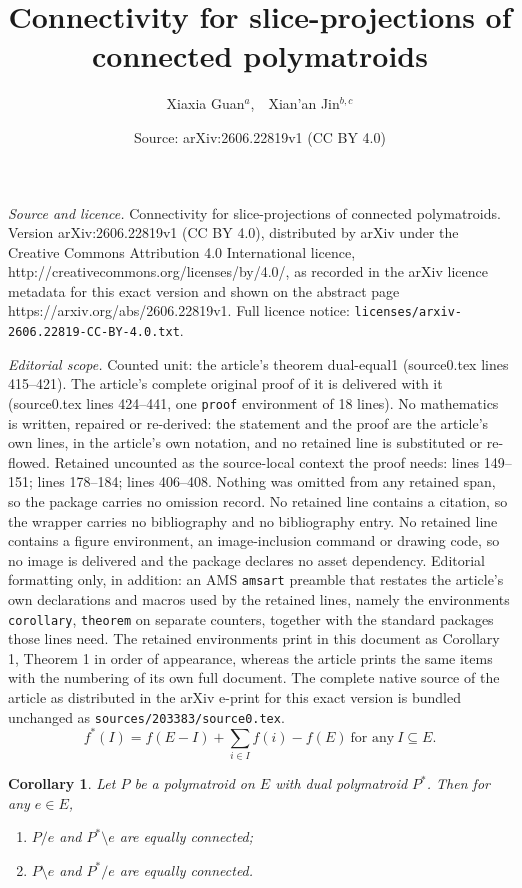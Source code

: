 \documentclass[10pt,a4paper]{amsart}
\title{Connectivity for slice-projections of connected polymatroids}
\author{Xiaxia Guan$^{a}$,~~Xian'an Jin$^{b,c}$}
\date{Source: arXiv:2606.22819v1 (CC BY 4.0)}
\newtheorem{corollary}{Corollary}
\begin{document}
\maketitle

\noindent\emph{Source and licence.} Connectivity for slice-projections of connected polymatroids. Version arXiv:2606.22819v1 (CC BY 4.0), distributed by arXiv under the Creative Commons Attribution 4.0 International licence, http://creativecommons.org/licenses/by/4.0/, as recorded in the arXiv licence metadata for this exact version and shown on the abstract page https://arxiv.org/abs/2606.22819v1. Full licence notice: \texttt{licenses/arxiv-2606.22819-CC-BY-4.0.txt}.\par\smallskip

\noindent\textit{Editorial scope.} Counted unit: the article's theorem dual-equal1 (source0.tex lines 415--421). The article's complete original proof of it is delivered with it (source0.tex lines 424--441, one \texttt{proof} environment of 18 lines). No mathematics is written, repaired or re-derived: the statement and the proof are the article's own lines, in the article's own notation, and no retained line is substituted or re-flowed.  Retained uncounted as the source-local context the proof needs: lines 149--151; lines 178--184; lines 406--408.  Nothing was omitted from any retained span, so the package carries no omission record.  No retained line contains a citation, so the wrapper carries no bibliography and no bibliography entry.  No retained line contains a figure environment, an image-inclusion command or drawing code, so no image is delivered and the package declares no asset dependency.  Editorial formatting only, in addition: an AMS \texttt{amsart} preamble that restates the article's own declarations and macros used by the retained lines, namely the environments \texttt{corollary}, \texttt{theorem} on separate counters, together with the standard packages those lines need.  The retained environments print in this document as Corollary 1, Theorem 1 in order of appearance, whereas the article prints the same items with the numbering of its own full document.  The complete native source of the article as distributed in the arXiv e-print for this exact version is bundled unchanged as \texttt{sources/203383/source0.tex}.
\begin{equation}\label{dual-rank}
f^*(I) = f(E-I) + \sum_{i \in I} f(i) - f(E) ~\text{for any}~I\subseteq E.
\end{equation}

 \begin{corollary}\label{dual-equal}
Let $P$ be a polymatroid on $E$ with dual polymatroid $P^*$.  Then for any $e\in E$,
\begin{enumerate}
\item [(i)] $P/e$ and $P^*\setminus e$ are equally connected;
\item [(ii)] $P\setminus e$ and $P^*/e$ are equally connected.
\end{enumerate}
\end{corollary}
\end{document}
